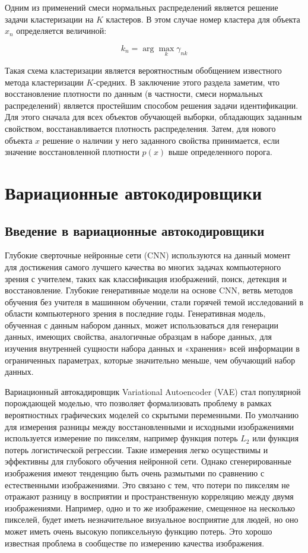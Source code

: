 Одним из применений смеси нормальных распределений является решение задачи кластеризации на $K$ кластеров. В этом случае номер кластера для объекта $x_n$ определяется величиной:

$$
	k_n = \arg \max_k \gamma_{nk}
$$

Такая схема кластеризации является вероятностным обобщением известного метода кластеризации $K$-средних.
В заключение этого раздела заметим, что восстановление плотности по данным (в частности, смеси нормальных распределений) является  простейшим способом решения задачи идентификации. Для этого сначала для всех объектов обучающей выборки, обладающих заданным свойством, восстанавливается плотность распределения. Затем, для нового объекта $x$ решение о наличии у него заданного свойства принимается, если значение восстановленной плотности $p(x)$ выше определенного порога.

\chapter{Вариационные автокодировщики}
\section{Введение в вариационные автокодировщики}
Глубокие сверточные нейронные сети (CNN) используются на данный момент для достижения самого лучшего качества во многих задачах компьютерного зрения с учителем, таких как классификация изображений, поиск, детекция и восстановление. Глубокие генеративные модели на основе CNN, ветвь методов обучения без учителя в машинном обучении, стали горячей темой исследований в области компьютерного зрения в последние годы. Генеративная модель, обученная с данным набором данных, может использоваться для генерации данных, имеющих свойства, аналогичные образцам в наборе данных, для изучения внутренней сущности набора данных и «хранения» всей информации в ограниченных параметрах, которые значительно меньше, чем обучающий набор данных.

Вариационный автокадировщик Variational Autoencoder (VAE) стал популярной порождающей моделью, что позволяет формализовать проблему в рамках вероятностных графических моделей со скрытыми переменными. По умолчанию для измерения разницы между восстановленными и исходными изображениями используется измерение по пикселям, например функция потерь $L_2$ или функция потерь логистической регрессии. Такие измерения легко осуществимы и эффективны для глубокого обучения нейронной сети. Однако сгенерированные изображения имеют тенденцию быть очень размытыми по сравнению с естественными изображениями. Это связано с тем, что потери по пикселям не отражают разницу в восприятии и пространственную корреляцию между двумя изображениями. Например, одно и то же изображение, смещенное на несколько пикселей, будет иметь незначительное визуальное восприятие для людей, но оно может иметь очень высокую попиксельную функцию потерь. Это хорошо известная проблема в сообществе по измерению качества изображения.

